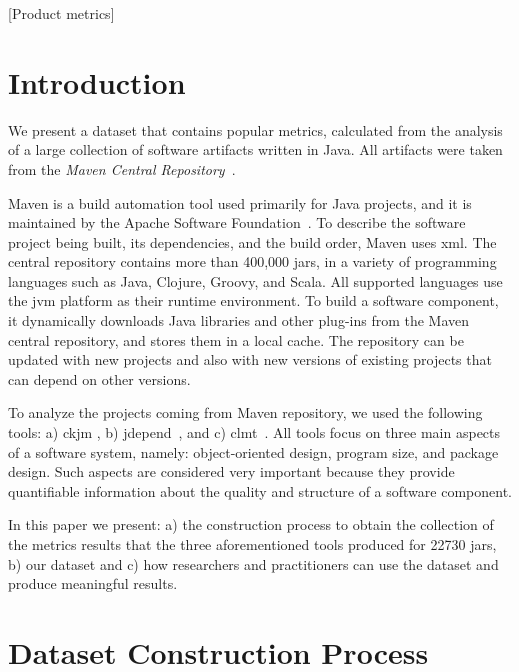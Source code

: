 \documentclass{sig-alternate}
\begin{document}
[Product metrics]



\section{Introduction}
\label{sec:intro}

We present a dataset that contains popular metrics, calculated from the analysis of a large collection of software artifacts written in Java. All artifacts were taken from the {\it Maven Central Repository}~\cite{MAVEN}.

Maven is a build automation tool used primarily for Java projects, and it is maintained by the Apache Software Foundation~\cite{MAVEN}. To describe the software project being built, its dependencies, and the build order, Maven uses {\sc xml}. The central repository contains more than 400,000 {\sc jar}s, in a variety of programming languages such as Java, Clojure, Groovy, and Scala. All supported languages use the {\sc jvm} platform as their runtime environment. To build a software component, it dynamically downloads Java libraries and other plug-ins from the Maven central repository, and stores them in a local cache. The repository can be updated with new projects and also with new versions of existing projects that can depend on other versions.

To analyze the projects coming from Maven repository, we used the following tools: a) {\sc ckjm} \cite{Spi05g}, b) {\sc jd}epend~\cite{JDEPEND}, and c) {\sc clmt}~\cite{SGKL09}. All tools focus on three main aspects of a software system, namely: object-oriented design, program size, and package design. Such aspects are considered very important because they provide quantifiable information about the quality and structure of a software component.

In this paper we present: a) the construction process to obtain the collection of the metrics results that the three aforementioned tools produced for 22730 {\sc jar}s, b) our dataset and c) how researchers and practitioners can use the dataset and produce meaningful results.

\section{Dataset Construction Process}
\label{sec:data}
\end{document}
